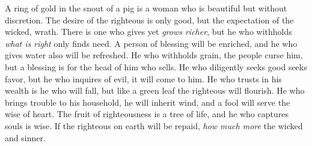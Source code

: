 \begin{biblechapter}
\verse A ring of gold in the snout of a pig 
is a woman who is beautiful but without discretion.
\verse The desire of the righteous is only good, 
but the expectation of the wicked, wrath.
\verse There is one who gives yet \textit{grows richer}, 
but he who withholds \textit{what is right} only finds need.
\verse A person of blessing will be enriched, 
and he who gives water also will be refreshed.
\verse He who withholds grain, the people curse him, 
but a blessing is for the head of him who sells.
\verse He who diligently seeks good seeks favor, 
but he who inquires of evil, it will come to him.
\verse He who trusts in his wealth is he who will fall, 
but like a green leaf the righteous will flourish.
\verse He who brings trouble to his household, he will inherit wind, 
and a fool will serve the wise of heart.
\verse The fruit of righteousness is a tree of life, 
and he who captures souls is wise.
\verse If the righteous on earth will be repaid, 
\textit{how much more} the wicked and sinner.
\end{biblechapter}

